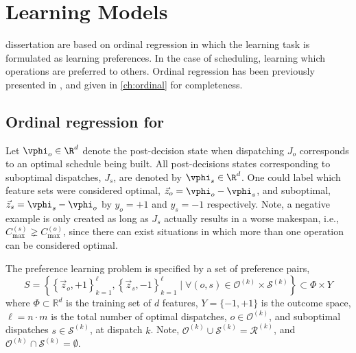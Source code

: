 
\chapter{Learning Models}\label{ch:prefmodels} 

 dissertation are based on ordinal regression in which the learning task is formulated as learning preferences. In the case of scheduling, learning which operations are preferred to others. Ordinal regression has been previously presented in \cite{Ru06:PPSN}, and given in \cref{ch:ordinal} for completeness. 

\section{Ordinal regression for \JSP}

Let $\vphi_{o}\in\R^d$ denote the post-decision state when dispatching $J_o$ corresponds to an optimal schedule being built. All post-decisions states corresponding to suboptimal dispatches, $J_s$, are denoted by $\vphi_{s}\in\R^d$. One could label which feature sets were considered optimal, $\vec{z}_{o}=\vphi_{o}-\vphi_{s}$, and suboptimal, $\vec{z}_{s}=\vphi_{s}-\vphi_{o}$ by $y_o=+1$ and $y_s=-1$ respectively. 
Note, a negative example is only created as long as $J_s$ actually results in a worse makespan, i.e., $C_{\max}^{(s)}\gneq C_{\max}^{(o)}$, since there can exist situations in which more than one operation can be considered optimal.

The preference learning problem is specified by a set of preference pairs,
\begin{equation}
S = \left\{\left\{\vec{z}_o,+1\right\}_{k=1}^{\ell},\left\{\vec{z}_s,-1\right\}_{k=1}^{\ell}
\;|\;\forall (o,s) \in \mathcal{O}^{(k)} \times \mathcal{S}^{(k)}
\right\}\subset \Phi\times Y \label{eq:S:jsp}
\end{equation}
where $\Phi\subset \mathbb{R}^d$ is the training set of $d$ features, $Y=\{-1,+1\}$ is the outcome space, $\ell=n\cdot m$ is the total number of optimal dispatches, $o\in\mathcal{O}^{(k)}$, and suboptimal dispatches $s\in \mathcal{S}^{(k)}$, at dispatch $k$. Note, $\mathcal{O}^{(k)}\cup\mathcal{S}^{(k)}=\mathcal{R}^{(k)}$, and $\mathcal{O}^{(k)}\cap\mathcal{S}^{(k)}=\emptyset$. 

